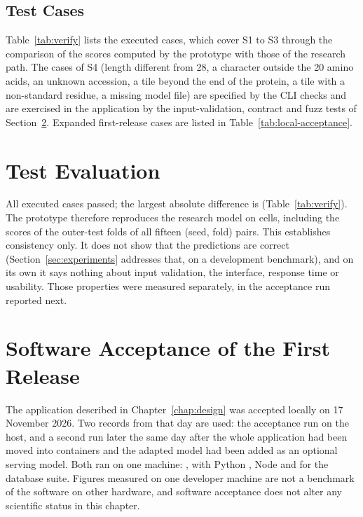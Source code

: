 \subsection{Test Cases}
Table~\ref{tab:verify} lists the executed cases, which cover S1 to S3 through the comparison of the scores computed by the prototype with those of the research path. The cases of S4
(length different from 28, a character outside the 20 amino acids, an unknown accession, a tile beyond the end of the protein, a tile with a non-standard residue, a missing model file) are specified
by the CLI checks and are exercised in the application by the input-validation, contract and fuzz
tests of Section~\ref{sec:app-evaluation}. Expanded first-release cases are listed in
Table~\ref{tab:local-acceptance}.

\begin{table}[htbp]
  \centering
  \caption[Executed test cases: agreement of the prototype with the research runner]{Executed test cases: agreement of the prototype with the research runner. The tolerance is $10^{-9}$.}\label{tab:verify}
  
\end{table}

\section{Test Evaluation}\label{sec:testeval}
All \nVerNChecks{} executed cases passed; the largest absolute difference is \nVerMax{} (Table~\ref{tab:verify}). The prototype therefore reproduces the research model on \nVerCells{} cells,
including the scores of the outer-test folds of all fifteen (seed, fold) pairs. This establishes consistency only. It does not show that the predictions are correct (Section~\ref{sec:experiments} addresses that, on a development
benchmark), and on its own it says nothing about input validation, the interface, response time or
usability. Those properties were measured separately, in the acceptance run reported next.

\section{Software Acceptance of the First Release}\label{sec:app-evaluation}
The application described in Chapter~\ref{chap:design} was accepted locally on 17 November 2026.
Two records from that day are used: the acceptance run on the host, and a second run later the same
day after the whole application had been moved into containers and the adapted model had been added
as an optional serving model. Both ran on one machine: \nAppHost{}, with Python \nAppPython{}, Node
\nAppNode{} and \nAppPostgres{} for the database suite. Figures measured on one
developer machine are not a benchmark of the software on other hardware, and software acceptance
does not alter any scientific status in this chapter.

